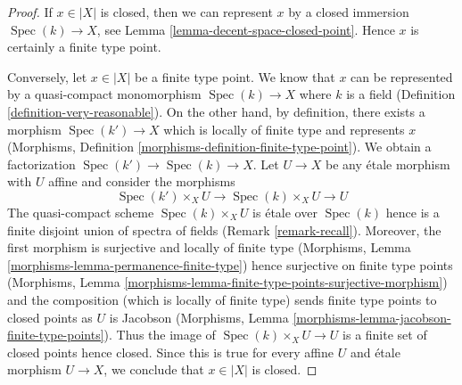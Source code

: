 \documentclass{stacks-project}
\theoremstyle{plain}
\theoremstyle{definition}
\theoremstyle{remark}
\numberwithin{equation}{subsection}
\def\Spec{\mathop{\mathrm{Spec}}}
\begin{document}
\begin{proof}
If $x \in |X|$ is closed, then we can represent $x$ by a closed
immersion $\Spec(k) \to X$, see Lemma \ref{lemma-decent-space-closed-point}.
Hence $x$ is certainly a finite type point.

\medskip\noindent
Conversely, let $x \in |X|$ be a finite type point. We know that
$x$ can be represented by a quasi-compact monomorphism
$\Spec(k) \to X$ where $k$ is a field
(Definition \ref{definition-very-reasonable}). On the other hand,
by definition, there exists a morphism $\Spec(k') \to X$
which is locally of finite type and represents $x$
(Morphisms, Definition \ref{morphisms-definition-finite-type-point}).
We obtain a factorization $\Spec(k') \to \Spec(k) \to X$.
Let $U \to X$ be any \'etale morphism with $U$ affine and consider
the morphisms
$$
\Spec(k') \times_X U \to \Spec(k) \times_X U \to U
$$
The quasi-compact scheme $\Spec(k) \times_X U$ is \'etale over
$\Spec(k)$ hence is a finite disjoint union
of spectra of fields (Remark \ref{remark-recall}).
Moreover, the first morphism is surjective and locally of finite type
(Morphisms, Lemma \ref{morphisms-lemma-permanence-finite-type})
hence surjective on finite type points
(Morphisms, Lemma \ref{morphisms-lemma-finite-type-points-surjective-morphism})
and the composition (which is locally of finite type) sends
finite type points to closed points as $U$ is Jacobson
(Morphisms, Lemma \ref{morphisms-lemma-jacobson-finite-type-points}).
Thus the image of
$\Spec(k) \times_X U \to U$ is a finite set of closed points hence
closed. Since this is true for every affine $U$ and \'etale morphism
$U \to X$, we conclude that $x \in |X|$ is closed.
\end{proof}
\end{document}
